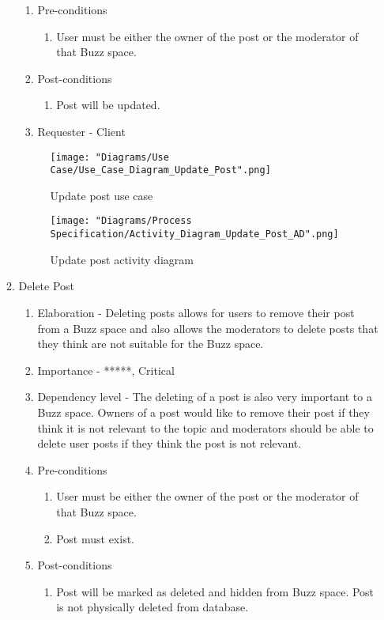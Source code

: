 \documentclass[12pt]{article}
\begin{document}
\begin{enumerate}
\begin{enumerate}
\begin{enumerate}
   	 		\item Pre-conditions
   			\begin{enumerate}
    			\item User must be either the owner of the post or the moderator of that Buzz space.
    		\end{enumerate}
     		\item Post-conditions
    		\begin{enumerate}
  	  			\item Post will be updated.
   	 		\end{enumerate}
   	 		\item Requester - Client
  		\end{enumerate}
  	\begin{figure}[h]
  		\centering
  		\texttt{[image: "Diagrams/Use Case/Use\_Case\_Diagram\_Update\_Post".png]}
  		\caption{Update post use case}
  	\end{figure}
  	\begin{figure}[h]
  		\centering
  		\texttt{[image: "Diagrams/Process Specification/Activity\_Diagram\_Update\_Post\_AD".png]}
  		\caption{Update post activity diagram}
  	\end{figure}
  	\clearpage
  	\newpage
  		\item Delete Post
  		\begin{enumerate}
  			\item Elaboration - Deleting posts allows for users to remove their post from a Buzz space and also allows the moderators to delete posts that they think are not suitable for the Buzz space.
   	 		\item Importance - *****, Critical
   	 		\item Dependency level - The deleting of a post is also very important to a Buzz space. Owners of a post would like to remove their post if they think it is not relevant to the topic and moderators should be able to delete user posts if they think the post is not relevant.
   	 		\item Pre-conditions
   			\begin{enumerate}
    			\item User must be either the owner of the post or the moderator of that Buzz space.
    			\item Post must exist.
    		\end{enumerate}
     		\item Post-conditions
    		\begin{enumerate}
  	  			\item Post will be marked as deleted and hidden from Buzz space. Post is not physically deleted from database.

\end{enumerate}
\end{enumerate}
\end{enumerate}
\end{enumerate}
\end{document}
